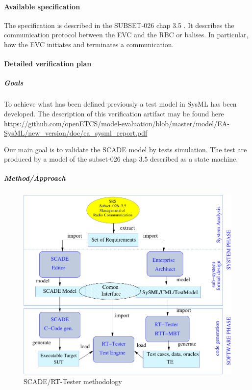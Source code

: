 \documentclass{article}
\begin{document}
\paragraph{Available specification}

The specification is described in the
SUBSET-026\cite{unisig_subset-026_2012} chap 3.5 \cite{chap3-5}. It
describes the communication protocol between the EVC and the RBC or
balises. In particular, how the EVC initiates and terminates a
communication.



\paragraph{Detailed verification plan}

\subparagraph{Goals}

To achieve what has been defined previously a test model in SysML has
been developed. The description of this verification artifact may be
found here \url{https://github.com/openETCS/model-evaluation/blob/master/model/EA-SysML/new_version/doc/ea_sysml_report.pdf}

Our main goal is to validate the SCADE model by  tests simulation. The
test are produced by a model of the subset-026 chap 3.5 described as a
state machine.

\subparagraph{Method/Approach}

\begin{figure}
\includegraphics[width=\textwidth]{framework}
\caption{\label{fig:method}SCADE/RT-Tester methodology}
\end{figure}
\end{document}
